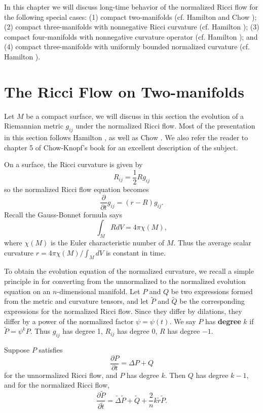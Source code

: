 In this chapter we will discuss long-time behavior of the normalized
Ricci flow for the following special cases: (1) compact
two-manifolds (cf. Hamilton \cite{Ha88} and Chow \cite{Chow}); (2)
compact three-manifolds with nonnegative Ricci curvature (cf.
Hamilton \cite{Ha82}); (3) compact four-manifolds with nonnegative
curvature operator (cf. Hamilton \cite{Ha86}); and (4) compact
three-manifolds with uniformly bounded normalized curvature (cf.
Hamilton \cite{Ha99}).


\section{The Ricci Flow on Two-manifolds}

Let $M$ be a compact surface, we will discuss in this section the
evolution of a Riemannian metric $g_{ij}$ under the normalized
Ricci flow. Most of the presentation in this section follows
Hamilton \cite{Ha88}, as well as Chow \cite{Chow}. We also refer
the reader to chapter 5 of Chow-Knopf's book \cite{CK04} for an
excellent description of the subject.

On a surface, the Ricci curvature is given by
$$
R_{ij}=\frac{1}{2}Rg_{ij}
$$
so the normalized Ricci flow equation becomes \begin{equation}
\frac{\partial}{\partial t}g_{ij}=(r-R)g_{ij}. %
\end{equation} Recall the Gauss-Bonnet formula says
$$
\int_MRdV=4\pi\chi(M),
$$
where $\chi(M)$ is the Euler characteristic number of $M$. Thus
the average scalar curvature $r=4\pi\chi(M)/\int_MdV$ is constant
in time.

To obtain the evolution equation of the normalized curvature, we
recall a simple principle in \cite {Ha82} for converting from the
unnormalized to the normalized evolution equation on an
$n$-dimensional manifold. Let $P$ and $Q$ be two expressions
formed from the metric and curvature tensors, and let $\tilde{P}$
and $\tilde{Q}$ be the corresponding expressions for the
normalized Ricci flow. Since they differ by dilations, they differ
by a power of the normalized factor $\psi=\psi(t)$. We say $P$ has
\textbf{degree} $k$ if $\tilde{P}=\psi^kP$. Thus
$g_{ij}$ has degree 1, $R_{ij}$ has degree 0, $R$ has degree $-1$.


\begin{lemma} 
  \label{lem:cz-normalized-evolution-homogeneous-quantities}

Suppose $P$ satisfies
$$
\frac{\partial P}{\partial t}=\Delta P+Q
$$
for the unnormalized Ricci flow, and $P$ has degree $k$. Then $Q$
has degree $k-1$, and for the normalized Ricci flow,
$$
\frac{\partial \tilde{P}}{\partial \tilde{t}}=\tilde{\Delta}
\tilde{P}+\tilde{Q}+\frac{2}{n}k\tilde{r}\tilde{P}.
$$
\end{lemma}

